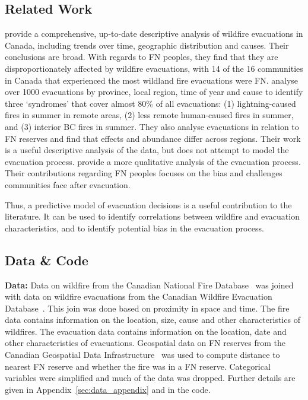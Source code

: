 \subsection{Related Work}\label{sec:related_work}

\cite{wildfire_evacs} provide a comprehensive, up-to-date descriptive analysis of wildfire evacuations in Canada, including trends over time, geographic distribution and causes. Their conclusions are broad. With regards to FN peoples, they find that they are disproportionately affected by wildfire evacuations, with 14 of the 16 communities in Canada that experienced the most wildland fire evacuations were FN. \cite{wildfire_syndromes} analyse over 1000 evacuations by province, local region, time of year and cause to identify three `syndromes' that cover almost 80\% of all evacuations: (1) lightning-caused fires in summer in remote areas, (2) less remote human-caused fires in summer, and (3) interior BC fires in summer. They also analyse evacuations in relation to FN reserves and find that effects and abundance differ across regions. Their work is a useful descriptive analysis of the data, but does not attempt to model the evacuation process. \cite{wildfire_management_evacuation_review} provide a more qualitative analysis of the evacuation process. Their contributions regarding FN peoples focuses on the bias and challenges communities face after evacuation.

Thus, a predictive model of evacuation decisions is a useful contribution to the literature. It can be used to identify correlations between wildfire and evacuation characteristics, and to identify potential bias in the evacuation process.

\subsection{Data \& Code}\label{sec:data}

\textbf{Data:} Data on wildfire from the Canadian National Fire Database~\cite{cnfdb} was joined with data on wildfire evacuations from the Canadian Wildfire Evacuation Database~\cite{evacdb}. This join was done based on proximity in space and time. The fire data contains information on the location, size, cause and other characteristics of wildfires. The evacuation data contains information on the location, date and other characteristics of evacuations. Geospatial data on FN reserves from the Canadian Geospatial Data Infrastructure~\cite{reservesdb} was used to compute distance to nearest FN reserve and whether the fire was in a FN reserve. Categorical variables were simplified and much of the data was dropped. Further details are given in Appendix~\ref{sec:data_appendix} and in the code.

